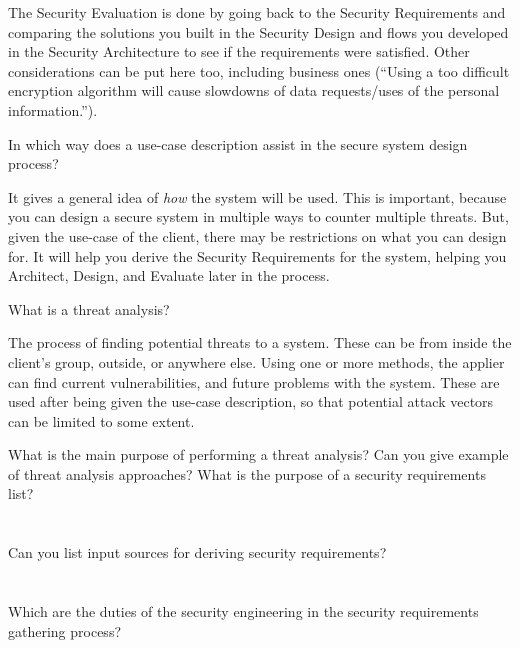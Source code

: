 \begin{questions}
\begin{parts}
\begin{solution}
      The Security Evaluation is done by going back to the Security Requirements and comparing the solutions you built in the Security Design and flows you developed in the Security Architecture to see if the requirements were satisfied.
      Other considerations can be put here too, including business ones (``Using a too difficult encryption algorithm will cause slowdowns of data requests/uses of the personal information.'').
    \end{solution}
  \end{parts}

\question{} In which way does a use-case description assist in the secure system design process?
  \begin{solution}
    It gives a general idea of \emph{how} the system will be used.
    This is important, because you can design a secure system in multiple ways to counter multiple threats.
    But, given the use-case of the client, there may be restrictions on what you can design for.
    It will help you derive the Security Requirements for the system, helping you Architect, Design, and Evaluate later in the process.
  \end{solution}

\question{} What is a threat analysis?
  \begin{solution}
    The process of finding potential threats to a system.
    These can be from inside the client's group, outside, or anywhere else.
    Using one or more methods, the applier can find current vulnerabilities, and future problems with the system.
    These are used after being given the use-case description, so that potential attack vectors can be limited to some extent.
  \end{solution}

\question{} What is the main purpose of performing a threat analysis?
\question{} Can you give example of threat analysis approaches?
\question{} What is the purpose of a security requirements list?
  \begin{parts}
  \part{} Can you list input sources for deriving security requirements?
  \part{} Which are the duties of the security engineering in the security requirements gathering process?
  \end{parts}


\end{questions}
